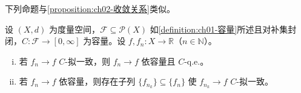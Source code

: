 \documentclass[../../main.tex]{subfiles}%
\begin{document}
下列命题与\cref{proposition:ch02-收敛关系}类似。

\begin{proposition}\label{proposition:ch02-容量收敛关系}
设 $(X,d)$ 为度量空间，$\mathscr F\subseteq\mathscr P(X)$ 如\cref{definition:ch01-容量}所述且对补集封闭，$C:\mathscr F\to[0,\infty]$ 为容量。设 $f,f_n:X\to\mathbb{R}$（$n\in\mathbb{N}$）。
\begin{enumerate}[(i)]
\item 若 $f_n\to f$ $C$-拟一致，则 $f_n\to f$ 依容量且 $C$-q.e.。
\item 若 $f_n\to f$ 依容量，则存在子列 $\{f_{n_k}\}\subseteq\{f_n\}$ 使 $f_{n_k}\to f$ $C$-拟一致。
\end{enumerate}
\end{proposition}

\end{document}
